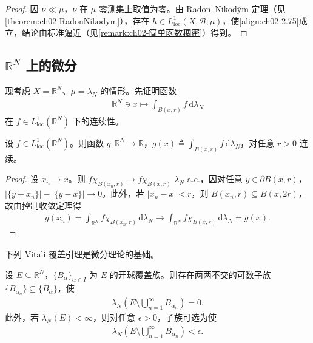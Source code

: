\documentclass[../../main.tex]{subfiles}%
\begin{document}
\begin{proof}
因 $\nu\ll\mu$，$\nu$ 在 $\mu$ 零测集上取值为零。由 Radon--Nikod\'ym 定理（见\cref{theorem:ch02-RadonNikodym}），存在 $h\in L^1_{\mathrm{loc}}(X,\mathscr B,\mu)$，使\eqref{align:ch02-2.75}成立，结论由标准逼近（见\cref{remark:ch02-简单函数稠密}）得到。
\end{proof}

\subsection{$\mathbb R^N$ 上的微分}\label{subsection:ch02-RN微分}

现考虑 $X=\mathbb R^N$、$\mu=\lambda_N$ 的情形。先证明函数
\begin{align*}
\mathbb R^N\ni x\mapsto\int_{B(x,r)}f\,\mathrm{d}\lambda_N
\end{align*}
在 $f\in L^1_{\mathrm{loc}}(\mathbb R^N)$ 下的连续性。

\begin{lemma}\label{lemma:ch02-球积分连续}
设 $f\in L^1_{\mathrm{loc}}(\mathbb R^N)$。则函数 $g:\mathbb R^N\to\mathbb R$，$g(x)\triangleq \int_{B(x,r)}f\,\mathrm{d}\lambda_N$，对任意 $r>0$ 连续。
\end{lemma}

\begin{proof}
设 $x_n\to x$。则 $f\chi_{B(x_n,r)}\to f\chi_{B(x,r)}$ $\lambda_N$-a.e.，因对任意 $y\in\partial B(x,r)$，$|\{y-x_n\}|-|\{y-x\}|\to0$。此外，若 $|x_n-x|<r$，则 $B(x_n,r)\subseteq B(x,2r)$，故由控制收敛定理得
\begin{align*}
g(x_n)=\int_{\mathbb R^N}f\chi_{B(x_n,r)}\,\mathrm{d}\lambda_N\to\int_{\mathbb R^N}f\chi_{B(x,r)}\,\mathrm{d}\lambda_N=g(x).
\end{align*}
\end{proof}

下列 Vitali 覆盖引理是微分理论的基础。

\begin{lemma}[Vitali 覆盖]\label{lemma:ch02-Vitali覆盖}
设 $E\subseteq\mathbb R^N$，$\{B_\alpha\}_{\alpha\in I}$ 为 $E$ 的开球覆盖族。则存在两两不交的可数子族 $\{B_{\alpha_n}\}\subseteq\{B_\alpha\}$，使
\begin{align*}
\lambda_N(E\setminus\bigcup_{n=1}^\infty B_{\alpha_n})=0.
\end{align*}
此外，若 $\lambda_N(E)<\infty$，则对任意 $\epsilon>0$，子族可选为使
\begin{align*}
\lambda_N\left(E\setminus\bigcup_{n=1}^\infty B_{\alpha_n}\right)<\epsilon.
\end{align*}
\end{lemma}
\end{document}

